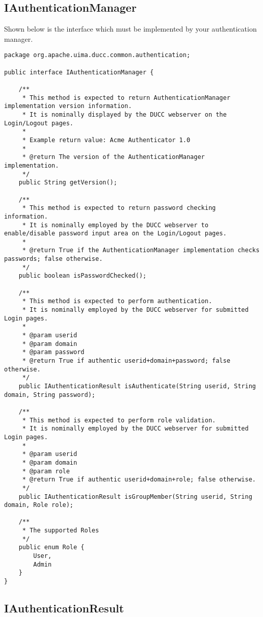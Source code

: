 \subsection{IAuthenticationManager}
       
    Shown below is the interface which must be implemented by your
    authentication manager.
    
    \begin{verbatim}
package org.apache.uima.ducc.common.authentication;

public interface IAuthenticationManager {
    
    /**
     * This method is expected to return AuthenticationManager implementation version information.  
     * It is nominally displayed by the DUCC webserver on the Login/Logout pages.
     * 
     * Example return value: Acme Authenticator 1.0
     * 
     * @return The version of the AuthenticationManager implementation.
     */
    public String getVersion();
    
    /**
     * This method is expected to return password checking information.  
     * It is nominally employed by the DUCC webserver to enable/disable password input area on the Login/Logout pages.
     * 
     * @return True if the AuthenticationManager implementation checks passwords; false otherwise.
     */
    public boolean isPasswordChecked();
    
    /**
     * This method is expected to perform authentication.
     * It is nominally employed by the DUCC webserver for submitted Login pages.
     * 
     * @param userid
     * @param domain
     * @param password
     * @return True if authentic userid+domain+password; false otherwise.
     */
    public IAuthenticationResult isAuthenticate(String userid, String domain, String password);
    
    /**
     * This method is expected to perform role validation.
     * It is nominally employed by the DUCC webserver for submitted Login pages.
     * 
     * @param userid
     * @param domain
     * @param role
     * @return True if authentic userid+domain+role; false otherwise.
     */
    public IAuthenticationResult isGroupMember(String userid, String domain, Role role);
    
    /**
     * The supported Roles
     */
    public enum Role {
        User,
        Admin
    }
}
    \end{verbatim}


\subsection{IAuthenticationResult}
    
